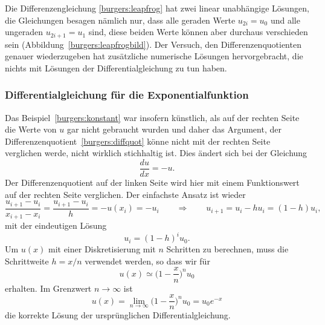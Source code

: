 Die Differenzengleichung
\eqref{burgers:leapfrog}
hat zwei linear unabhängige Lösungen, die Gleichungen besagen
nämlich nur, dass alle geraden Werte $u_{2i}=u_0$ und alle ungeraden
$u_{2i+1}=u_1$ sind, diese beiden Werte können aber durchaus verschieden
sein (Abbildung~\ref{burgers:leapfrogbild}).
Der Versuch, den Differenzenquotienten genauer wiederzugeben hat 
zusätzliche numerische Lösungen hervorgebracht, die nichts mit Lösungen
der Differentialgleichung zu tun haben.

\subsubsection{Differentialgleichung für die Exponentialfunktion}
Das Beispiel~\eqref{burgers:konstant} war insofern künstlich, als auf der
rechten Seite die Werte von $u$ gar nicht gebraucht wurden und daher das
Argument, der Differenzenquotient~\eqref{burgers:diffquot} könne nicht
mit der rechten Seite verglichen werde, nicht wirklich stichhaltig ist.
Dies ändert sich bei der Gleichung
\begin{equation}
\frac{du}{dx} = -u.
\label{burgers:expo}
\end{equation}
Der Differenzenquotient auf der linken Seite wird hier mit einem
Funktionswert auf der rechten Seite verglichen. 
Der einfachste Ansatz ist wieder
\[
\frac{u_{i+1}-u_i}{x_{i+1}-x_{i}}
=
\frac{u_{i+1}-u_i}{h} = -u(x_i) = -u_i
\qquad\Rightarrow\qquad
u_{i+1} = u_i-hu_i=(1-h)u_i,
\]
mit der eindeutigen Lösung
\[
u_i = (1-h)^iu_0.
\]
Um $u(x)$ mit einer Diskretisierung mit $n$ Schritten zu berechnen,
muss die Schrittweite $h=x/n$ verwendet werden, so dass wir für
\[
u(x) \simeq \biggl(1-\frac{x}{n}\biggr)^n u_0
\]
erhalten.
Im Grenzwert $n\to\infty$ ist
\[
u(x) = \lim_{n\to\infty} \biggl(1-\frac{x}{n}\biggr)^n u_0 = u_0e^{-x}
\]
die korrekte Lösung der ursprünglichen Differentialgleichung.

